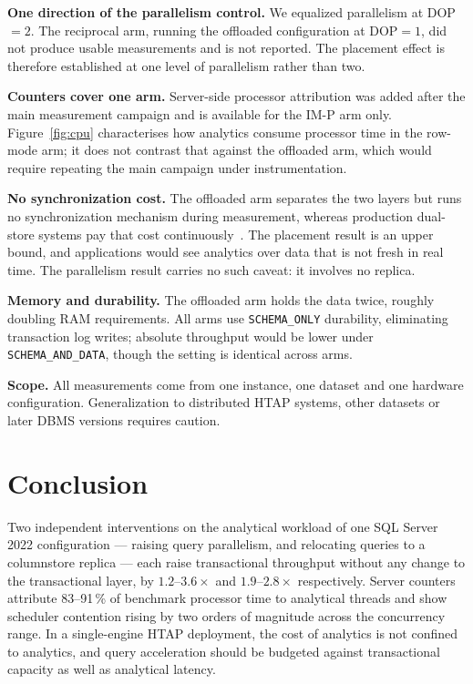 \documentclass[conference,a4paper]{IEEEtran}
\begin{document}
\textbf{One direction of the parallelism control.} We equalized parallelism at
DOP${}=2$. The reciprocal arm, running the offloaded configuration at
DOP${}=1$, did not produce usable measurements and is not reported. The
placement effect is therefore established at one level of parallelism rather
than two.

\textbf{Counters cover one arm.} Server-side processor attribution was added
after the main measurement campaign and is available for the IM-P arm only.
Figure~\ref{fig:cpu} characterises how analytics consume processor time in the
row-mode arm; it does not contrast that against the offloaded arm, which would
require repeating the main campaign under instrumentation.

\textbf{No synchronization cost.} The offloaded arm separates the two layers
but runs no synchronization mechanism during measurement, whereas production
dual-store systems pay that cost continuously~\cite{huang2020tidb, yang2020f1}.
The placement result is an upper bound, and applications would see analytics
over data that is not fresh in real time. The parallelism result carries no
such caveat: it involves no replica.

\textbf{Memory and durability.} The offloaded arm holds the data twice, roughly
doubling RAM requirements. All arms use \texttt{SCHEMA\_ONLY} durability,
eliminating transaction log writes; absolute throughput would be lower under
\texttt{SCHEMA\_AND\_DATA}, though the setting is identical across arms.

\textbf{Scope.} All measurements come from one instance, one dataset and one
hardware configuration. Generalization to distributed HTAP systems, other
datasets or later DBMS versions requires caution.

\section{Conclusion}

Two independent interventions on the analytical workload of one SQL Server 2022
configuration --- raising query parallelism, and relocating queries to a
columnstore replica --- each raise transactional throughput without any change
to the transactional layer, by $1.2$--$3.6\times$ and $1.9$--$2.8\times$
respectively. Server counters attribute 83--91\,\% of benchmark processor time
to analytical threads and show scheduler contention rising by two orders of
magnitude across the concurrency range. In a single-engine HTAP deployment, the
cost of analytics is not confined to analytics, and query acceleration should
be budgeted against transactional capacity as well as analytical latency.
\end{document}
